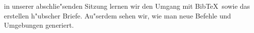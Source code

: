 \documentclass[11pt,ngerman]{g-brief2}
\begin{document}
\begin{g-brief}

in unserer abschlie"senden Sitzung lernen wir den Umgang mit Bib\TeX\ sowie das erstellen h"ubscher Briefe. Au"serdem sehen wir, wie man neue Befehle und Umgebungen generiert. 

\end{g-brief}
\end{document}
